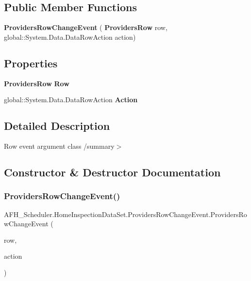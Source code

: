 \subsection*{Public Member Functions}
\begin{DoxyCompactItemize}
\item 
\textbf{ Providers\+Row\+Change\+Event} (\textbf{ Providers\+Row} row, global\+::\+System.\+Data.\+Data\+Row\+Action action)
\end{DoxyCompactItemize}
\subsection*{Properties}
\begin{DoxyCompactItemize}
\item 
\textbf{ Providers\+Row} \textbf{ Row}\hspace{0.3cm}{\ttfamily  [get]}
\item 
global\+::\+System.\+Data.\+Data\+Row\+Action \textbf{ Action}\hspace{0.3cm}{\ttfamily  [get]}
\end{DoxyCompactItemize}


\subsection{Detailed Description}
Row event argument class /summary$>$ 

\subsection{Constructor \& Destructor Documentation}
\mbox{\label{class_a_f_h___scheduler_1_1_home_inspection_data_set_1_1_providers_row_change_event_a6e09e1f56b1acccbfe36e99f034c39fa}} 
\subsubsection{ProvidersRowChangeEvent()}
{\footnotesize\ttfamily A\+F\+H\+\_\+\+Scheduler.\+Home\+Inspection\+Data\+Set.\+Providers\+Row\+Change\+Event.\+Providers\+Row\+Change\+Event (\begin{DoxyParamCaption}\item[{\textbf{ Providers\+Row}}]{row,  }\item[{global\+::\+System.\+Data.\+Data\+Row\+Action}]{action }\end{DoxyParamCaption})}




